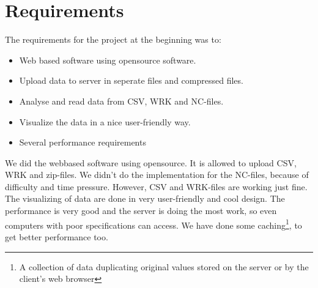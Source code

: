\chapter{Requirements}
The requirements for the project at the beginning was to:
\begin{itemize}
\item Web based software using opensource software.
\item Upload data to server in seperate files and compressed files.
\item Analyse and read data from CSV, WRK and NC-files.
\item Visualize the data in a nice user-friendly way.
\item Several performance requirements
\end{itemize}
We did the webbased software using opensource.
It is allowed to upload CSV, WRK and zip-files.
We didn't do the implementation for the NC-files, because of difficulty and time pressure. However, CSV and WRK-files are working just fine.
The visualizing of data are done in very user-friendly and cool design.
The performance is very good and the server is doing the most work, so even computers with poor specifications can access. We have done some caching\footnote{A collection of data duplicating original values stored on the server or by the client's web browser}, to get better performance too.